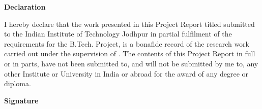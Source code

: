 \begin{flushright}
\huge{\textbf{Declaration}}
\end{flushright}
I hereby declare that the work presented in this Project Report titled \ttitle{} submitted to the Indian Institute of Technology Jodhpur in partial fulfilment of the requirements for the B.Tech. Project, is a bonafide record of the research work carried out under the supervision of \supname. The contents of this Project Report in full or in parts, have not been submitted to, and will not be submitted by me to, any other Institute or University in India or abroad for the award of any degree or diploma.
\vspace{2cm}
\begin{flushright}
\large{\textbf{Signature}}\\
\emph{\authorname}\\
\rn
\end{flushright}